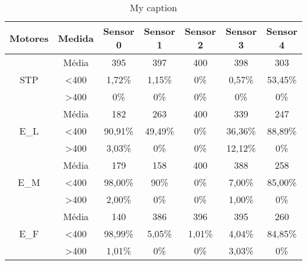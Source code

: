 \begin{table}[]
\centering
\caption{My caption}
\label{my-label}
\begin{tabular}{|c|c|ccccc|}
\hline
\textbf{Motores}                & \textbf{Medida}  & \textbf{Sensor 0} & \textbf{Sensor 1} & \textbf{Sensor 2} & \textbf{Sensor 3} & \textbf{Sensor 4} \\ \hline
\multirow{3}{*}{STP}            & Média            & 395               & 397               & 400               & 398               & 303               \\
                                & \textless 400    & 1,72\%            & 1,15\%            & 0\%            & 0,57\%            & 53,45\%           \\
                                & \textgreater 400 & 0\%            & 0\%            & 0\%            & 0\%            & 0\%            \\ \hline
\multirow{3}{*}{E\_L}           & Média            & 182               & 263               & 400               & 339               & 247               \\
                                & \textless 400    & 90,91\%           & 49,49\%           & 0\%            & 36,36\%           & 88,89\%           \\
                                & \textgreater 400 & 3,03\%            & 0\%            & 0\%            & 12,12\%           & 0\%            \\ \hline
\multirow{3}{*}{E\_M}           & Média            & 179               & 158               & 400               & 388               & 258               \\
                                & \textless 400    & 98,00\%           & 90\%           & 0\%            & 7,00\%            & 85,00\%           \\
                                & \textgreater 400 & 2,00\%            & 0\%            & 0\%            & 1,00\%            & 0\%            \\ \hline
\multirow{3}{*}{E\_F}           & Média            & 140               & 386               & 396               & 395               & 260               \\
                                & \textless 400    & 98,99\%           & 5,05\%            & 1,01\%            & 4,04\%            & 84,85\%           \\
                                & \textgreater 400 & 1,01\%            & 0\%            & 0\%            & 3,03\%            & 0\%            \\ \hline

\end{tabular}
\end{table}
